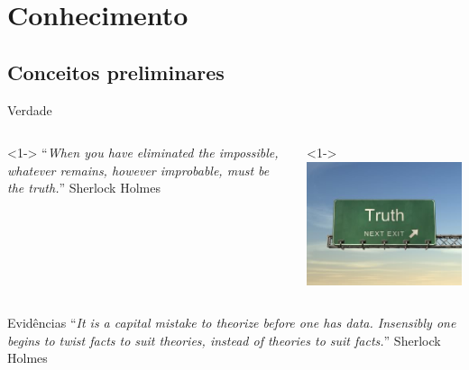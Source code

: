 \documentclass{beamer}
\begin{document}
\section{Conhecimento}

\subsection{Conceitos preliminares}


\begin{frame}{Verdade}
  \begin{columns}
    \begin{column}{6cm}<1-> ``{\em When you have eliminated the
        impossible, whatever remains, however improbable, must be the
        truth.}'' Sherlock Holmes
    \end{column}
    \begin{column}{4cm}<1->
      \includegraphics[height=0.4\textheight]{Intro/truth}
    \end{column}
  \end{columns}
\end{frame}


\begin{frame}{Evidências}
  ``{\em It is a capital mistake to theorize before one has
    data. Insensibly one begins to twist facts to suit theories,
    instead of theories to suit facts.}'' Sherlock Holmes
\end{frame}
\end{document}
